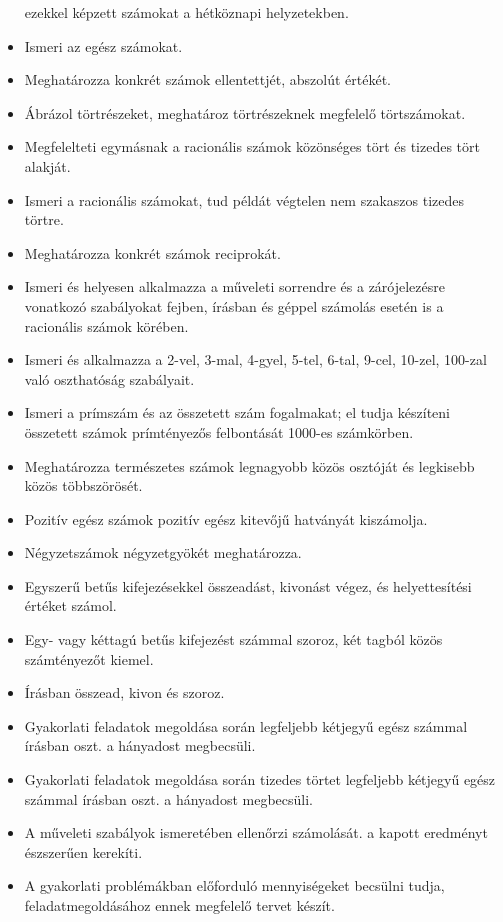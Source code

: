\begin{itemize}
  ezekkel képzett számokat a hétköznapi helyzetekben.
\item
  Ismeri az egész számokat.
\item
  Meghatározza konkrét számok ellentettjét, abszolút értékét.
\item
  Ábrázol törtrészeket, meghatároz törtrészeknek megfelelő törtszámokat.
\item
  Megfelelteti egymásnak a racionális számok közönséges tört és tizedes
  tört alakját.
\item
  Ismeri a racionális számokat, tud példát végtelen nem szakaszos
  tizedes törtre.
\item
  Meghatározza konkrét számok reciprokát.
\item
  Ismeri és helyesen alkalmazza a műveleti sorrendre és a zárójelezésre
  vonatkozó szabályokat fejben, írásban és géppel számolás esetén is a
  racionális számok körében.
\item
  Ismeri és alkalmazza a 2-vel, 3-mal, 4-gyel, 5-tel, 6-tal, 9-cel,
  10-zel, 100-zal való oszthatóság szabályait.
\item
  Ismeri a prímszám és az összetett szám fogalmakat; el tudja készíteni
  összetett számok prímtényezős felbontását 1000-es számkörben.
\item
  Meghatározza természetes számok legnagyobb közös osztóját és legkisebb
  közös többszörösét.
\item
  Pozitív egész számok pozitív egész kitevőjű hatványát kiszámolja.
\item
  Négyzetszámok négyzetgyökét meghatározza.
\item
  Egyszerű betűs kifejezésekkel összeadást, kivonást végez, és
  helyettesítési értéket számol.
\item
  Egy- vagy kéttagú betűs kifejezést számmal szoroz, két tagból közös
  számtényezőt kiemel.
\item
  Írásban összead, kivon és szoroz.
\item
  Gyakorlati feladatok megoldása során legfeljebb kétjegyű egész számmal
  írásban oszt. a hányadost megbecsüli.
\item
  Gyakorlati feladatok megoldása során tizedes törtet legfeljebb
  kétjegyű egész számmal írásban oszt. a hányadost megbecsüli.
\item
  A műveleti szabályok ismeretében ellenőrzi számolását. a kapott
  eredményt észszerűen kerekíti.
\item
  A gyakorlati problémákban előforduló mennyiségeket becsülni tudja,
  feladatmegoldásához ennek megfelelő tervet készít.

\end{itemize}
